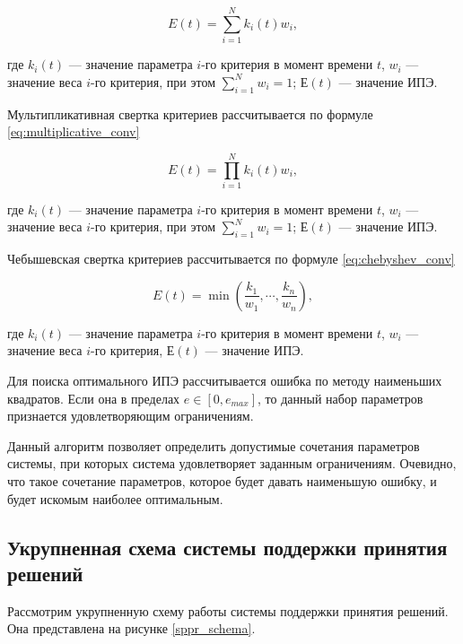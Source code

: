 \begin{equation}
    \label{eq:additive_conv}
    E(t) = \sum^N_{i=1} k_i(t) w_i,
\end{equation}
\vspace{\belowdisplayshortskip}

\noindent
где $k_i(t)$ --- значение параметра $i$-го критерия в момент времени $t$,
$w_i$ --- значение веса $i$-го критерия, при этом $\sum^N_{i=1} w_i = 1$; 
$Е(t)$ --- значение ИПЭ.

Мультипликативная свертка критериев рассчитывается по формуле \ref{eq:multiplicative_conv}

\begin{equation}
    \label{eq:multiplicative_conv}
    E(t) = \prod^N_{i=1} k_i(t) w_i,
\end{equation}
\vspace{\belowdisplayshortskip}

\noindent
где $k_i(t)$ --- значение параметра $i$-го критерия в момент времени $t$,
$w_i$ --- значение веса $i$-го критерия, при этом $\sum^N_{i=1} w_i = 1$; 
$Е(t)$ --- значение ИПЭ.

Чебышевская свертка критериев рассчитывается по формуле \ref{eq:chebyshev_conv}

\begin{equation}
    \label{eq:chebyshev_conv}
    E(t) = \min(\frac{k_1}{w_1}, \cdots, \frac{k_n}{w_n}),
\end{equation}
\vspace{\belowdisplayshortskip}

\noindent
где $k_i(t)$ --- значение параметра $i$-го критерия в момент времени $t$,
$w_i$ --- значение веса $i$-го критерия,
$Е(t)$ --- значение ИПЭ.

Для поиска оптимального ИПЭ рассчитывается ошибка по методу наименьших квадратов. 
Если она в пределах $e \in [0,e_{max}]$, то данный набор параметров признается удовлетворяющим ограничениям.

Данный алгоритм позволяет определить допустимые сочетания параметров системы, при которых система удовлетворяет заданным ограничениям. 
Очевидно, что такое сочетание параметров, которое будет давать наименьшую ошибку, и будет искомым наиболее оптимальным.

\subsection{Укрупненная схема системы поддержки принятия решений}
Рассмотрим укрупненную схему работы системы поддержки принятия решений.
Она представлена на рисунке \ref{sppr_schema}.

